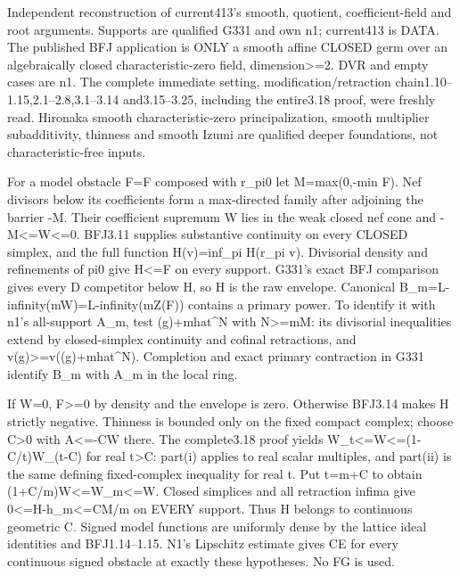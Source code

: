 \documentclass[11pt]{article}
\begin{document}
Independent reconstruction of current413's smooth, quotient, coefficient-field and root arguments. Supports are qualified G331 and own n1; current413 is DATA. The published BFJ application is ONLY a smooth affine CLOSED germ over an algebraically closed characteristic-zero field, dimension>=2. DVR and empty cases are n1. The complete immediate setting, modification/retraction chain1.10--1.15,2.1--2.8,3.1--3.14 and3.15--3.25, including the entire3.18 proof, were freshly read. Hironaka smooth characteristic-zero principalization, smooth multiplier subadditivity, thinness and smooth Izumi are qualified deeper foundations, not characteristic-free inputs.

For a model obstacle F=F composed with r\_pi0 let M=max(0,-min F). Nef divisors below its coefficients form a max-directed family after adjoining the barrier -M. Their coefficient supremum W lies in the weak closed nef cone and -M<=W<=0. BFJ3.11 supplies substantive continuity on every CLOSED simplex, and the full function H(v)=inf\_pi H(r\_pi v). Divisorial density and refinements of pi0 give H<=F on every support. G331's exact BFJ comparison gives every D competitor below H, so H is the raw envelope. Canonical B\_m=L-infinity(mW)=L-infinity(mZ(F)) contains a primary power. To identify it with n1's all-support A\_m, test (g)+mhat\textasciicircum{}N with N>=mM: its divisorial inequalities extend by closed-simplex continuity and cofinal retractions, and v(g)>=v((g)+mhat\textasciicircum{}N). Completion and exact primary contraction in G331 identify B\_m with A\_m in the local ring.

If W=0, F>=0 by density and the envelope is zero. Otherwise BFJ3.14 makes H strictly negative. Thinness is bounded only on the fixed compact complex; choose C>0 with A<=-CW there. The complete3.18 proof yields W\_t<=W<=(1-C/t)W\_(t-C) for real t>C: part(i) applies to real scalar multiples, and part(ii) is the same defining fixed-complex inequality for real t. Put t=m+C to obtain (1+C/m)W<=W\_m<=W. Closed simplices and all retraction infima give 0<=H-h\_m<=CM/m on EVERY support. Thus H belongs to continuous geometric C. Signed model functions are uniformly dense by the lattice ideal identities and BFJ1.14--1.15. N1's Lipschitz estimate gives CE for every continuous signed obstacle at exactly these hypotheses. No FG is used.
\end{document}
